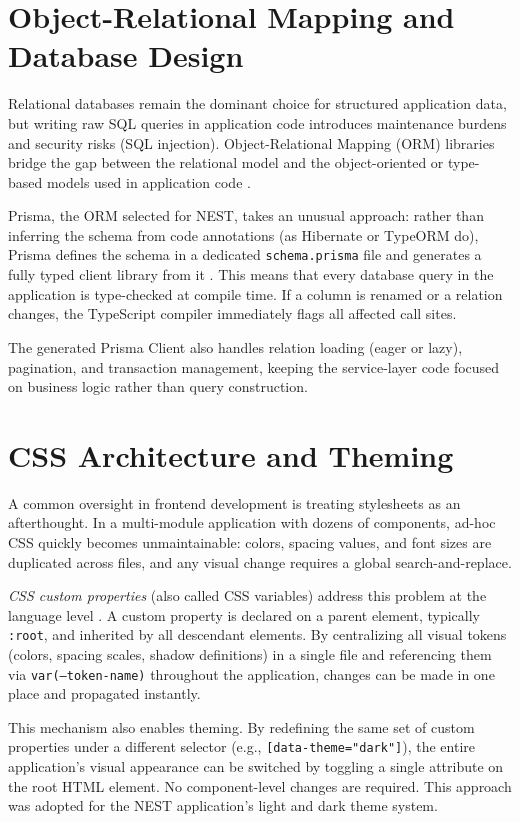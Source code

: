 \section{Object-Relational Mapping and Database Design}

Relational databases remain the dominant choice for structured application data, but writing raw SQL queries in application code introduces maintenance burdens and security risks (SQL injection). Object-Relational Mapping (ORM) libraries bridge the gap between the relational model and the object-oriented or type-based models used in application code \cite{elmasri2015fundamentals}.

Prisma, the ORM selected for NEST, takes an unusual approach: rather than inferring the schema from code annotations (as Hibernate or TypeORM do), Prisma defines the schema in a dedicated \texttt{schema.prisma} file and generates a fully typed client library from it \cite{prismaDocs}. This means that every database query in the application is type-checked at compile time. If a column is renamed or a relation changes, the TypeScript compiler immediately flags all affected call sites.

The generated Prisma Client also handles relation loading (eager or lazy), pagination, and transaction management, keeping the service-layer code focused on business logic rather than query construction.

\section{CSS Architecture and Theming}

A common oversight in frontend development is treating stylesheets as an afterthought. In a multi-module application with dozens of components, ad-hoc CSS quickly becomes unmaintainable: colors, spacing values, and font sizes are duplicated across files, and any visual change requires a global search-and-replace.

\textit{CSS custom properties} (also called CSS variables) address this problem at the language level \cite{mdnCssCustomProperties}. A custom property is declared on a parent element, typically \texttt{:root}, and inherited by all descendant elements. By centralizing all visual tokens (colors, spacing scales, shadow definitions) in a single file and referencing them via \texttt{var(--token-name)} throughout the application, changes can be made in one place and propagated instantly.

This mechanism also enables theming. By redefining the same set of custom properties under a different selector (e.g., \texttt{[data-theme="dark"]}), the entire application's visual appearance can be switched by toggling a single attribute on the root HTML element. No component-level changes are required. This approach was adopted for the NEST application's light and dark theme system.

